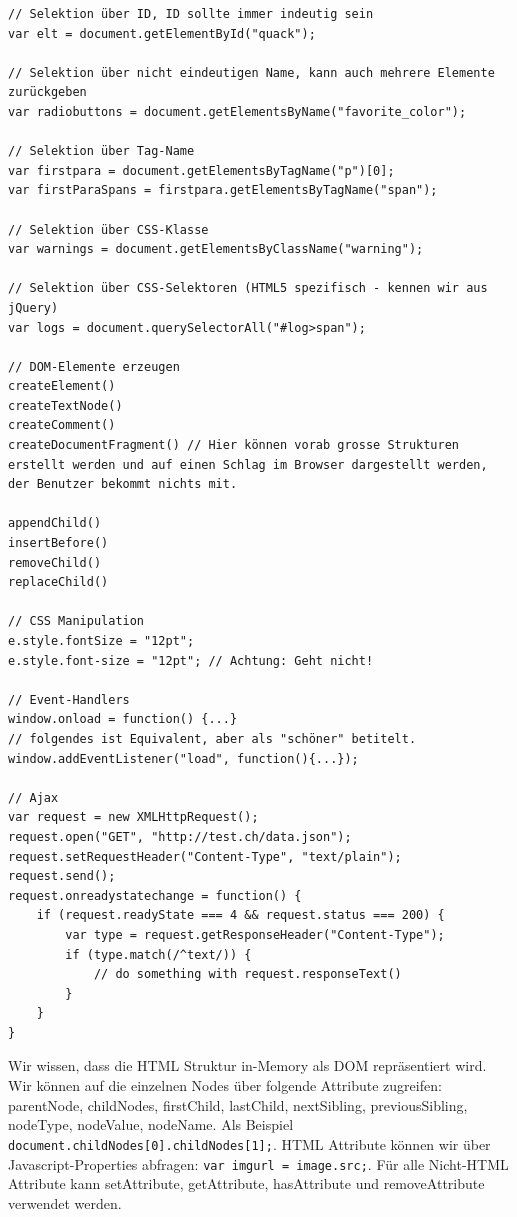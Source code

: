 \begin{lstlisting}[label=lst:dom-manipulation,caption=DOM Manipulation]
// Selektion über ID, ID sollte immer indeutig sein
var elt = document.getElementById("quack");

// Selektion über nicht eindeutigen Name, kann auch mehrere Elemente zurückgeben
var radiobuttons = document.getElementsByName("favorite_color");

// Selektion über Tag-Name
var firstpara = document.getElementsByTagName("p")[0];
var firstParaSpans = firstpara.getElementsByTagName("span");

// Selektion über CSS-Klasse
var warnings = document.getElementsByClassName("warning");

// Selektion über CSS-Selektoren (HTML5 spezifisch - kennen wir aus jQuery)
var logs = document.querySelectorAll("#log>span");

// DOM-Elemente erzeugen
createElement()
createTextNode()
createComment()
createDocumentFragment() // Hier können vorab grosse Strukturen erstellt werden und auf einen Schlag im Browser dargestellt werden, der Benutzer bekommt nichts mit.

appendChild()
insertBefore()
removeChild()
replaceChild()

// CSS Manipulation
e.style.fontSize = "12pt";
e.style.font-size = "12pt"; // Achtung: Geht nicht!

// Event-Handlers
window.onload = function() {...}
// folgendes ist Equivalent, aber als "schöner" betitelt.
window.addEventListener("load", function(){...});

// Ajax
var request = new XMLHttpRequest();
request.open("GET", "http://test.ch/data.json");
request.setRequestHeader("Content-Type", "text/plain");
request.send();
request.onreadystatechange = function() {
	if (request.readyState === 4 && request.status === 200) {
		var type = request.getResponseHeader("Content-Type");
		if (type.match(/^text/)) {
			// do something with request.responseText()
		}
	}
}
\end{lstlisting}

\newpage

Wir wissen, dass die HTML Struktur in-Memory als DOM repräsentiert wird. Wir können auf die einzelnen Nodes über folgende Attribute zugreifen: parentNode, childNodes, firstChild, lastChild, nextSibling, previousSibling, nodeType, nodeValue, nodeName. Als Beispiel \lstinline|document.childNodes[0].childNodes[1];|. HTML Attribute können wir über Javascript-Properties abfragen: \lstinline|var imgurl = image.src;|. Für alle Nicht-HTML Attribute kann setAttribute, getAttribute, hasAttribute und removeAttribute verwendet werden.

